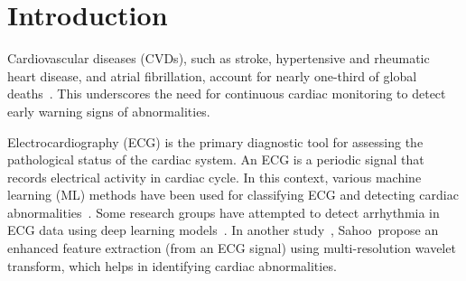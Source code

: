 

\section{Introduction}

Cardiovascular diseases (CVDs), such as stroke, hypertensive and rheumatic heart disease, and atrial fibrillation, account for nearly one-third of global deaths~\cite{who2024ncdportal}. This underscores the need for continuous cardiac monitoring to detect early warning signs of abnormalities. 


Electrocardiography (ECG) is the primary diagnostic tool for assessing the pathological status of the cardiac system. An ECG is a periodic signal that records electrical activity in cardiac cycle. In this context, various machine learning (ML) methods have been used for classifying ECG and detecting cardiac abnormalities~\cite{rai2013ecg,masetic2016congestive,lee2013atrial,saini2013qrs,seera2015classification}. Some research groups have attempted to detect arrhythmia in ECG data using deep learning models~\cite{malhotra2015long,chauhan2015anomaly,al2016deep}. In another study~\cite{sahoo2017multiresolution}, Sahoo~\etal propose an enhanced feature extraction (from an ECG signal) using multi-resolution wavelet transform, which helps in identifying cardiac abnormalities.


